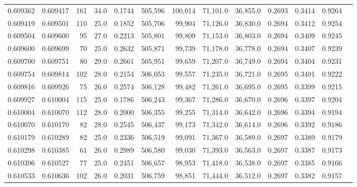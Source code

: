 \begin{tabular}{rrrrrrrrrrrrr}
0.609362 & 0.609417 &   161 & 34.0 &                                     0.1744 & 505,596 & 100,014 &  71,101.0 &  36,855.0 & 0.2693 & 0.3414 & 0.9264 \\
0.609419 & 0.609501 &   110 & 25.0 &                                     0.1852 & 505,706 &  99,904 &  71,126.0 &  36,830.0 & 0.2694 & 0.3412 & 0.9254 \\
0.609504 & 0.609600 &    95 & 27.0 &                                     0.2213 & 505,801 &  99,809 &  71,153.0 &  36,803.0 & 0.2694 & 0.3409 & 0.9245 \\
0.609600 & 0.609699 &    70 & 25.0 &                                     0.2632 & 505,871 &  99,739 &  71,178.0 &  36,778.0 & 0.2694 & 0.3407 & 0.9239 \\
0.609700 & 0.609751 &    80 & 29.0 &                                     0.2661 & 505,951 &  99,659 &  71,207.0 &  36,749.0 & 0.2694 & 0.3404 & 0.9231 \\
0.609754 & 0.609814 &   102 & 28.0 &                                     0.2154 & 506,053 &  99,557 &  71,235.0 &  36,721.0 & 0.2695 & 0.3401 & 0.9222 \\
0.609816 & 0.609926 &    75 & 26.0 &                                     0.2574 & 506,128 &  99,482 &  71,261.0 &  36,695.0 & 0.2695 & 0.3399 & 0.9215 \\
0.609927 & 0.610004 &   115 & 25.0 &                                     0.1786 & 506,243 &  99,367 &  71,286.0 &  36,670.0 & 0.2696 & 0.3397 & 0.9204 \\
0.610004 & 0.610070 &   112 & 28.0 &                                     0.2000 & 506,355 &  99,255 &  71,314.0 &  36,642.0 & 0.2696 & 0.3394 & 0.9194 \\
0.610070 & 0.610170 &    82 & 28.0 &                                     0.2545 & 506,437 &  99,173 &  71,342.0 &  36,614.0 & 0.2696 & 0.3392 & 0.9186 \\
0.610179 & 0.610289 &    82 & 25.0 &                                     0.2336 & 506,519 &  99,091 &  71,367.0 &  36,589.0 & 0.2697 & 0.3389 & 0.9179 \\
0.610298 & 0.610385 &    61 & 26.0 &                                     0.2989 & 506,580 &  99,030 &  71,393.0 &  36,563.0 & 0.2697 & 0.3387 & 0.9173 \\
0.610396 & 0.610527 &    77 & 25.0 &                                     0.2451 & 506,657 &  98,953 &  71,418.0 &  36,538.0 & 0.2697 & 0.3385 & 0.9166 \\
0.610533 & 0.610636 &   102 & 26.0 &                                     0.2031 & 506,759 &  98,851 &  71,444.0 &  36,512.0 & 0.2697 & 0.3382 & 0.9157 \\

\end{tabular}
